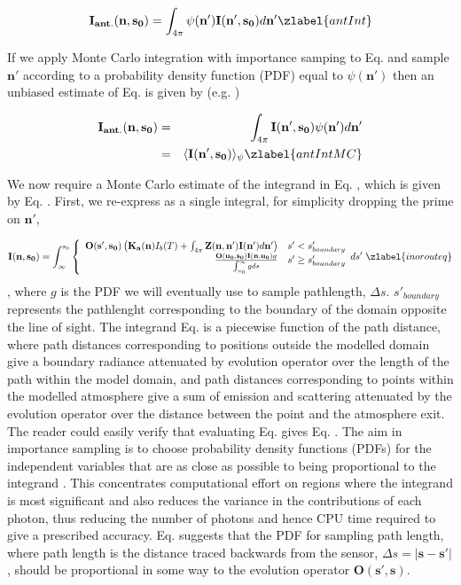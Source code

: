 \begin{equation}
\mathbf{I_{ant.}(n,s_0)}=\int_{4\pi}\psi(\mathbf{n'})\mathbf{I(n',s_0)}d\mathbf{n'}
\zlabel{antInt}
\end{equation}

If we apply Monte Carlo integration with importance samping to
Eq.  and sample $\mathbf{n'}$ according to a probability
density function (PDF) equal to $\psi(\mathbf{n'})$ then an unbiased
estimate of Eq.  is given by (e.g. \cite{press:1992:numerical})

\begin{eqnarray}
\mathbf{I_{ant.}(n,s_0)}&=&\int_{4\pi}\mathbf{I(n',s_0)}\psi(\mathbf{n'})d\mathbf{n'}\\
&=&\langle \mathbf{I(n',s_0)} \rangle_\psi
\zlabel{antIntMC}
\end{eqnarray}

We now require a Monte Carlo estimate of the integrand in
Eq. , which is given by Eq. .  First, we
re-express  as a single integral, for simplicity dropping
the prime on $\mathbf{n'}$,

\begin{equation}
\mathbf{I(n,s_0)}=\int^{s_0}_\infty\left\{\begin{array}{rl}
\mathbf{O(s',s_0)}\left(\mathbf{K_a(n)}I_b(T)
+\int_{4\pi}\mathbf{Z(n,n')}\mathbf{I(n')}d\mathbf{n'}\right) & s'< s'_{boundary} \\
\frac{\mathbf{O(u_0,s_0)I(n,u_0)}g}{\int^\infty_{u_0}gds} & s'\ge s'_{boundary}
\end{array}ds'\right.
\zlabel{inorouteq}
\end{equation}
, where $g$ is the PDF we will eventually use to sample pathlength,
$\Delta s$. $s'_{boundary}$ represents the pathlenght corresponding to
the boundary of the domain opposite the line of sight.
The integrand Eq.  is a piecewise function of the
path distance, where path distances corresponding to positions outside
the modelled domain give a boundary radiance attenuated by evolution
operator over the length of the path within the model domain, and path
distances corresponding to points within the modelled atmosphere give
a sum of emission and scattering attenuated by the evolution operator
over the distance between the point and the atmosphere exit. 
The reader
could easily verify that evaluating Eq.  gives
Eq. . The aim in importance sampling is to choose probability density functions
(PDFs) for the independent variables that are
as close as possible to being proportional to the integrand
\cite{liu:01}. This concentrates computational effort on regions where
the integrand is most significant and also reduces the variance in the contributions of each photon, thus reducing
the number of photons and hence CPU time required to give a
prescribed accuracy.  Eq.  suggests that the PDF for
sampling path length, where path length is the distance traced backwards
from the sensor, $\Delta s=\left|\mathbf{s}-\mathbf{s'}\right|$, should be proportional in some way to the evolution
operator $\mathbf{O(s',s)}$. 

